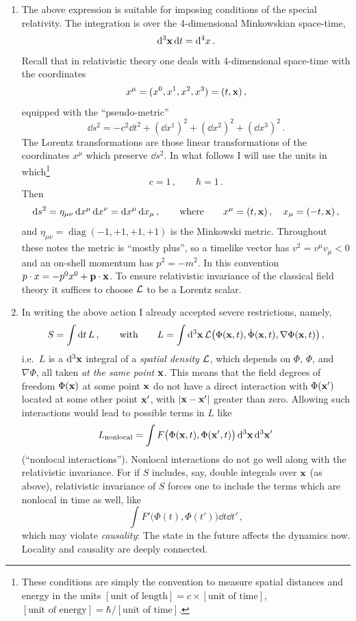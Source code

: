 \begin{enumerate}
\item The above expression is suitable for imposing conditions of the special
relativity. The integration is over the 4-dimensional Minkowskian space-time,
\[
\mathop{}\!\mathrm{d}^3\mathbf{x}\mathop{}\!\mathrm{d} t=\mathop{}\!\mathrm{d}^4x\,.
\]
Recall that in relativistic theory one deals with 4-dimensional space-time
with the coordinates
\[
x^\mu=(x^0,x^1,x^2,x^3)=(t,\mathbf{x})\,,
\]
equipped with the ``pseudo-metric''
\[
\dd s^2=-c^2\dd t^2+(\dd x^1)^2+(\dd x^2)^2+(\dd x^3)^2\,.
\]
The Lorentz transformations are those linear transformations of the
coordinates $x^\mu$ which preserve $\dd s^2$. In what follows I will use the
units in which\footnote{These conditions are simply the convention to measure
spatial distances and energy in the units
$[\text{unit of length}]=c\times[\text{unit of time}]$,
$[\text{unit of energy}]=\hbar/[\text{unit of time}]$.}
\[
c=1\,,\qquad \hbar=1\,.
\]
Then
\[
\mathop{}\!\mathrm{d} s^2=\eta_{\mu\nu}\mathop{}\!\mathrm{d} x^\mu \mathop{}\!\mathrm{d} x^\nu=\mathop{}\!\mathrm{d} x^\mu\mathop{}\!\mathrm{d} x_\mu\,,\qquad\text{where}\qquad x^\mu=(t,\mathbf{x})\,,\quad x_\mu=(-t,\mathbf{x})\,,
\]
and $\eta_{\mu\nu}=\operatorname{diag}(-1,+1,+1,+1)$ is the Minkowski metric.
Throughout these notes the metric is ``mostly plus'', so a timelike vector
has $v^2=v^\mu v_\mu<0$ and an on-shell momentum has $p^2=-m^2$. In this
convention $p\cdot x=-p^0x^0+\mathbf{p}\cdot\mathbf{x}$.
To ensure relativistic invariance of the classical field theory it suffices
to choose $\mathcal{L}$ to be a Lorentz scalar.

\item In writing the above action I already accepted severe restrictions,
namely,
\[
S=\int \mathop{}\!\mathrm{d} t\,L\,,\qquad\text{with}\qquad
L=\int \mathop{}\!\mathrm{d}^3\mathbf{x}\,\mathcal{L}\bigl(\Phi(\mathbf{x},t),\dot\Phi(\mathbf{x},t),\nabla\Phi(\mathbf{x},t)\bigr)\,,
\]
i.e.\ $L$ is a $\mathop{}\!\mathrm{d}^3\mathbf{x}$ integral of a \emph{spatial density} $\mathcal{L}$, which
depends on $\Phi$, $\dot\Phi$, and $\nabla\Phi$, all taken \emph{at the same
point} $\mathbf{x}$. This means that the field degrees of freedom $\Phi(\mathbf{x})$ at
some point $\mathbf{x}$ do not have a direct interaction with $\Phi(\mathbf{x}')$ located
at some other point $\mathbf{x}'$, with $|\mathbf{x}-\mathbf{x}'|$ greater than zero. Allowing
such interactions would lead to possible terms in $L$ like
\[
L_{\text{nonlocal}}=\int F\bigl(\Phi(\mathbf{x},t),\Phi(\mathbf{x}',t)\bigr)\mathop{}\!\mathrm{d}^3\mathbf{x}\mathop{}\!\mathrm{d}^3\mathbf{x}'
\]
(``nonlocal interactions''). Nonlocal interactions do not go well along with
the relativistic invariance. For if $S$ includes, say, double integrals over
$\mathbf{x}$ (as above), relativistic invariance of $S$ forces one to include the
terms which are nonlocal in time as well, like
\[
\int F'\bigl(\Phi(t),\Phi(t')\bigr)\dd t\dd t'\,,
\]
which may violate \emph{causality}: The state in the future affects the
dynamics now. Locality and causality are deeply connected.


\end{enumerate}
